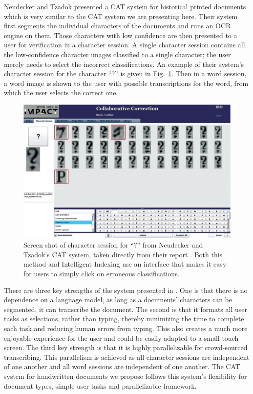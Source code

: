 \documentclass[conference]{IEEEtran}
\begin{document}
Neudecker and Tzadok\cite{Neudecker2010} presented a CAT system for historical printed documents which is very similar to the CAT system we are presenting here. Their system first segments the individual characters of the documents and runs an OCR engine on them. Those characters with low confidence are then presented to a user for verification in a character session. A single character session contains all the low-confidence character images classified to a single character; the user merely needs to select the incorrect classifications.
An example of their system's character session for the character ``?'' is given in Fig.~\ref{fig:carpet}. 
Then in a word session, a word image is shown to the user with possible transcriptions for the word, from which the user selects the correct one.

\begin{figure}
    \centering
    \includegraphics[width=.47\textwidth]{carpet}
    \caption{Screen shot of character session for ``?'' from Neudecker and Tzadok's CAT system, taken directly from their report \cite{Neudecker2010}. Both this method and Intelligent Indexing use an interface that makes it easy for users to simply click on erroneous classifications.}
    \label{fig:carpet}
\end{figure}

There are three key strengths of the system presented in \cite{Neudecker2010}. One is that there is no dependence on a language model, as long as a documents' characters can be segmented, it can transcribe the document. The second is that it formats all user tasks as selections, rather than typing, thereby minimizing the time to complete each task and reducing human errors from typing. This also creates a much more enjoyable experience for the user and could be easily adapted to a small touch screen. The third key strength is that it is highly parallelizable for crowd-sourced transcribing. This parallelism is achieved as all character sessions are independent of one another and all word sessions are independent of one another. The CAT system for handwritten documents we propose follows this system's flexibility for document types, simple user tasks and parallelizable framework.
\end{document}
